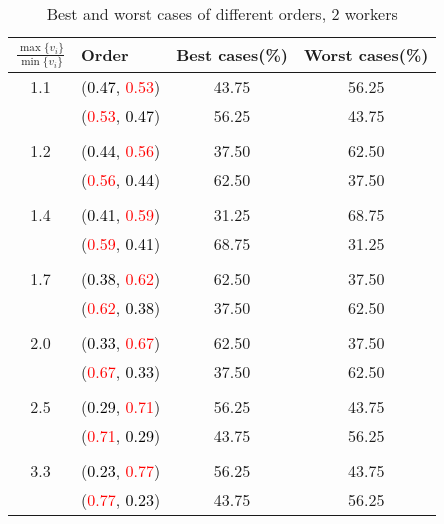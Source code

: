 \documentclass[10pt,a4paper]{report}
\begin{document}
    \begin{center}
	\small
	\begin{longtable}{clcc}
		\caption{Best and worst cases of different orders, 2 workers}\\
		\toprule
		\setlength{\tabcolsep}{1mm}
		\renewcommand\baselinestretch{0.5}\selectfont
		$\frac{\max\{v_i\}}{\min\{v_i\}}$ & Order & Best cases(\%) & Worst cases(\%) \\
			\midrule		1.1			&(\textcolor{black}{0.47}, \textcolor{red}{0.53})&43.75&56.25\\
			&(\textcolor{red}{0.53}, \textcolor{black}{0.47})&56.25&43.75\\
		&&&\\
		1.2			&(\textcolor{black}{0.44}, \textcolor{red}{0.56})&37.50&62.50\\
			&(\textcolor{red}{0.56}, \textcolor{black}{0.44})&62.50&37.50\\
		&&&\\
		1.4			&(\textcolor{black}{0.41}, \textcolor{red}{0.59})&31.25&68.75\\
			&(\textcolor{red}{0.59}, \textcolor{black}{0.41})&68.75&31.25\\
		&&&\\
		1.7			&(\textcolor{black}{0.38}, \textcolor{red}{0.62})&62.50&37.50\\
			&(\textcolor{red}{0.62}, \textcolor{black}{0.38})&37.50&62.50\\
		&&&\\
		2.0			&(\textcolor{black}{0.33}, \textcolor{red}{0.67})&62.50&37.50\\
			&(\textcolor{red}{0.67}, \textcolor{black}{0.33})&37.50&62.50\\
		&&&\\
		2.5			&(\textcolor{black}{0.29}, \textcolor{red}{0.71})&56.25&43.75\\
			&(\textcolor{red}{0.71}, \textcolor{black}{0.29})&43.75&56.25\\
		&&&\\
		3.3			&(\textcolor{black}{0.23}, \textcolor{red}{0.77})&56.25&43.75\\
			&(\textcolor{red}{0.77}, \textcolor{black}{0.23})&43.75&56.25\\
		\bottomrule
	\end{longtable}
\end{center}
\end{document}
